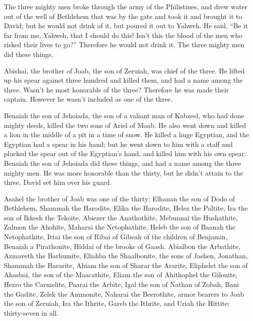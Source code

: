  The three mighty men broke through the army of the
Philistines, and drew water out of the well of Bethlehem that was by the
gate and took it and brought it to David; but he would not drink of it,
but poured it out to Yahweh.  He said, ``Be it far from
me, Yahweh, that I should do this! Isn't this the blood of the men who
risked their lives to go?'' Therefore he would not drink it. The three
mighty men did these things.

 Abishai, the brother of Joab, the son of Zeruiah, was
chief of the three. He lifted up his spear against three hundred and
killed them, and had a name among the three.  Wasn't he
most honorable of the three? Therefore he was made their captain.
However he wasn't included as one of the three.

 Benaiah the son of Jehoiada, the son of a valiant man of
Kabzeel, who had done mighty deeds, killed the two sons of Ariel of
Moab. He also went down and killed a lion in the middle of a pit in a
time of snow.  He killed a huge Egyptian, and the
Egyptian had a spear in his hand; but he went down to him with a staff
and plucked the spear out of the Egyptian's hand, and killed him with
his own spear.  Benaiah the son of Jehoiada did these
things, and had a name among the three mighty men.  He
was more honorable than the thirty, but he didn't attain to the three.
David set him over his guard.

 Asahel the brother of Joab was one of the thirty:
Elhanan the son of Dodo of Bethlehem,  Shammah the
Harodite, Elika the Harodite,  Helez the Paltite, Ira the
son of Ikkesh the Tekoite,  Abiezer the Anathothite,
Mebunnai the Hushathite,  Zalmon the Ahohite, Maharai the
Netophathite,  Heleb the son of Baanah the Netophathite,
Ittai the son of Ribai of Gibeah of the children of Benjamin,
 Benaiah a Pirathonite, Hiddai of the brooks of Gaash.
 Abialbon the Arbathite, Azmaveth the Barhumite,
 Eliahba the Shaalbonite, the sons of Jashen, Jonathan,
 Shammah the Hararite, Ahiam the son of Sharar the
Ararite,  Eliphelet the son of Ahasbai, the son of the
Maacathite, Eliam the son of Ahithophel the Gilonite, 
Hezro the Carmelite, Paarai the Arbite,  Igal the son of
Nathan of Zobah, Bani the Gadite,  Zelek the Ammonite,
Naharai the Beerothite, armor bearers to Joab the son of Zeruiah,
 Ira the Ithrite, Gareb the Ithrite,  and
Uriah the Hittite: thirty-seven in all.

